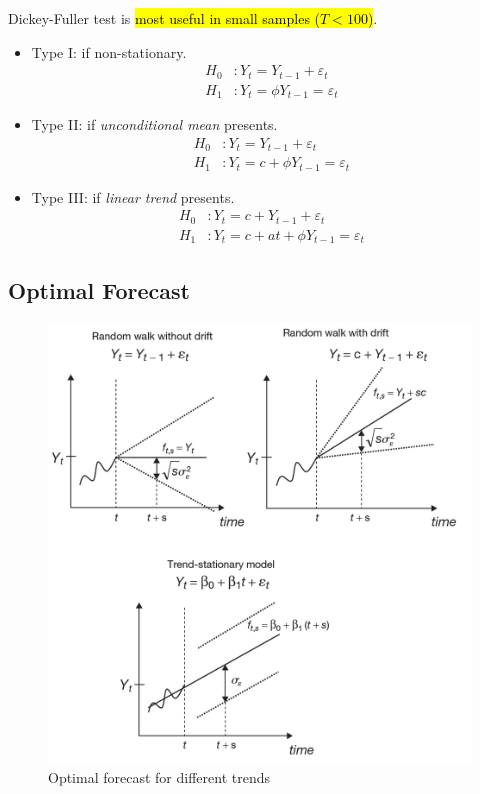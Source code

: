 \documentclass[11pt]{article}
\begin{document}
            \begin{remark}
    	        Dickey-Fuller test is \hl{most useful in small samples ($T<100$)}.
    	    \end{remark}
    	    
    	    \begin{itemize}
    	        \item Type I: if non-stationary.
    	        \begin{align}
    	            H_0 &: Y_t = Y_{t-1} + \varepsilon_t \\
    	            H_1 &: Y_t = \phi Y_{t-1} = \varepsilon_t
    	        \end{align}
    	        \item Type II: if \emph{unconditional mean} presents.
    	        \begin{align}
    	            H_0 &: Y_t = Y_{t-1} + \varepsilon_t \\
    	            H_1 &: Y_t = c + \phi Y_{t-1} = \varepsilon_t
    	        \end{align}
    	        \item Type III: if \emph{linear trend} presents.
    	        \begin{align}
    	            H_0 &: Y_t = c + Y_{t-1} + \varepsilon_t \\
    	            H_1 &: Y_t = c + at + \phi Y_{t-1} = \varepsilon_t
    	        \end{align}
    	    \end{itemize}
    	    
    	    \subsection{Optimal Forecast}
    	        \begin{figure}[H]
    	            \centering
    	            \includegraphics[width=0.7\linewidth]{./figures/trend_forecast.png}
    	            \caption{Optimal forecast for different trends}
    	        \end{figure}
	
\end{document}
